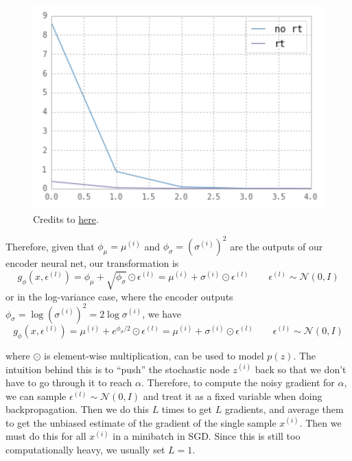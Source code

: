 \begin{example}[Gradient of Expection of $f(x) = x^2$ w.r.t. Gaussian]
    \begin{figure}[H]
      \centering 
      \includegraphics[scale=0.6]{img/reparam.png}
      \caption{Credits to \href{https://stats.stackexchange.com/questions/199605/how-does-the-reparameterization-trick-for-vaes-work-and-why-is-it-important}{here}.} 
      \label{fig:reparam}
    \end{figure}
  \end{example}

  Therefore, given that $\phi_\mu = \mu^{(i)}$ and $\phi_\sigma = (\sigma^{(i)})^2$ are the outputs of our encoder neural net, our transformation is 
  \begin{equation}
    g_\phi (x, \epsilon^{(l)}) = \phi_\mu + \sqrt{\phi_\sigma} \odot \epsilon^{(l)} = \mu^{(i)} + \sigma^{(i)} \odot \epsilon^{(l)} \qquad \epsilon^{(l)} \sim \mathcal{N}(0, I)
  \end{equation}
  or in the log-variance case, where the encoder outputs $\phi_\sigma = \log (\sigma^{(i)})^2 = 2 \log \sigma^{(i)}$, we have 
  \begin{equation}
    g_\phi (x, \epsilon^{(l)}) = \mu^{(i)} + e^{\phi_\sigma/2} \odot \epsilon^{(l)} = \mu^{(i)} + \sigma^{(i)} \odot \epsilon^{(l)} \qquad \epsilon^{(l)} \sim \mathcal{N}(0, I)
  \end{equation}

  where $\odot$ is element-wise multiplication, can be used to model $p(z)$. The intuition behind this is to ``push'' the stochastic node $z^{(i)}$ back so that we don't have to go through it to reach $\alpha$. Therefore, to compute the noisy gradient for $\alpha$, we can sample $\epsilon^{(l)} \sim \mathcal{N}(0, I)$ and treat it as a fixed variable when doing backpropagation. Then we do this $L$ times to get $L$ gradients, and average them to get the unbiased estimate of the gradient of the single sample $x^{(i)}$. Then we must do this for all $x^{(i)}$ in a minibatch in SGD. Since this is still too computationally heavy, we usually set $L=1$. 

